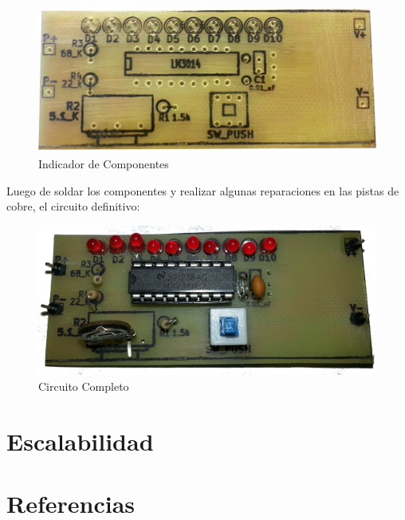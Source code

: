 \documentclass[12pt,a4paper]{article}
\begin{document}
			\begin{figure}[H]
			\centering
				\includegraphics[scale=0.25]{images/ayuda_comps.jpg}\caption{Indicador de Componentes}
			\end{figure}

			Luego de soldar los componentes y realizar algunas reparaciones en las pistas de cobre, el circuito definitivo:

			\begin{figure}[H]
			\centering
				\includegraphics[scale=0.1]{images/placa_completa.jpg}\caption{Circuito Completo}
			\end{figure}

	\newpage
	\section{Escalabilidad}
		\label{sec:escalabilidad}

	\newpage
	\section{Referencias}
		\label{sec:referencias}
\end{document}
